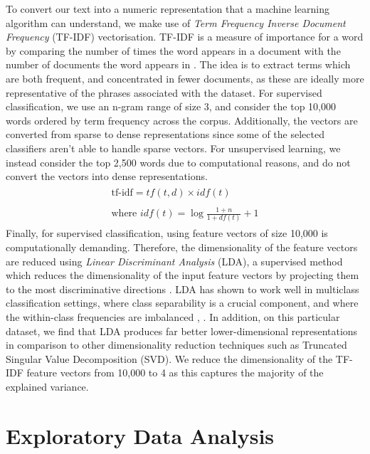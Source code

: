\documentclass{article}
\begin{document}
To convert our text into a numeric representation that a machine learning algorithm can understand, we make use of \emph{Term Frequency Inverse Document Frequency} (TF-IDF) vectorisation. TF-IDF is a measure of importance for a word by comparing the number of times the word appears in a document with the number of documents the word appears in \cite{leskovec2014mining}. The idea is to extract terms which are both frequent, and concentrated in fewer documents, as these are ideally more representative of the phrases associated with the dataset. For supervised classification, we use an n-gram range of size 3, and consider the top 10,000 words ordered by term frequency across the corpus. Additionally, the vectors are converted from sparse to dense representations since some of the selected classifiers aren't able to handle sparse vectors. For unsupervised learning, we instead consider the top 2,500 words due to computational reasons, and do not convert the vectors into dense representations. 
\begin{align*}
    \begin{array}{l}
        \text{tf-idf} = tf(t,d) \times idf(t) \\ \\
        \text{where } idf(t) = \log{\frac{1 + n}{1 + df(t)}} + 1
    \end{array}
\end{align*}
Finally, for supervised classification, using feature vectors of size 10,000 is computationally demanding. Therefore, the dimensionality of the feature vectors are reduced using \emph{Linear Discriminant Analysis} (LDA), a supervised method which reduces the dimensionality of the input feature vectors by projecting them to the most discriminative directions \cite{lda}. LDA has shown to work well in multiclass classification settings, where class separability is a crucial component, and where the within-class frequencies are imbalanced \cite{radovanovic2008text}, \cite{info10040150}. In addition, on this particular dataset, we find that LDA produces far better lower-dimensional representations in comparison to other dimensionality reduction techniques such as Truncated Singular Value Decomposition (SVD). We reduce the dimensionality of the TF-IDF feature vectors from 10,000 to 4 as this captures the majority of the explained variance. 

\section{Exploratory Data Analysis} 
\label{EDA}
\end{document}

